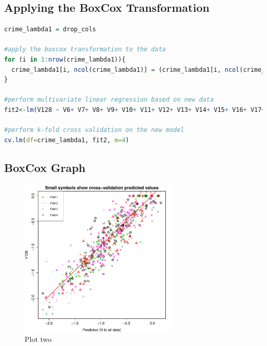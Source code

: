 \documentclass{article}
\begin{document}
\subsection{Applying the BoxCox Transformation}
\begin{lstlisting}[language=r]
crime_lambda1 = drop_cols

#apply the boxcox transformation to the data
for (i in 1:nrow(crime_lambda1)){
  crime_lambda1[i, ncol(crime_lambda1)] = (crime_lambda1[i, ncol(crime_lambda1)]^0.3-1)/0.3
}

#perform multivariate linear regression based on new data
fit2<-lm(V128 ~ V6+ V7+ V8+ V9+ V10+ V11+ V12+ V13+ V14+ V15+ V16+ V17+ V18+ V19+ V20+ V21+ V22+ V23+ V24+ V25+ V26+ V27+ V28+ V29+ V30+ V32+ V33+ V34+ V35+ V36+ V37+ V38+ V39+ V40+ V41+ V42+ V43+ V44+ V45+ V46+ V47+ V48+ V49+ V50+ V51+ V52+ V53+ V54+ V55+ V56+ V57+ V58+ V59+ V60+ V61+ V62+ V63+ V64+ V65+ V66+ V67+ V68+ V69+ V70+ V71+ V72+ V73+ V74+ V75+ V76+ V77+ V78+ V79+ V80+ V81+ V82+ V83+ V84+ V85+ V86+ V87+ V88+ V89+ V90+ V91+ V92+ V93+ V94+ V95+ V96+ V97+ V98+ V99+ V100+ V101+ V119+ V120+ V121+ V126, data=crime_lambda1)

#perform k-fold cross validation on the new model
cv.lm(df=crime_lambda1, fit2, m=4)
\end{lstlisting}

\subsection{BoxCox Graph}
\begin{figure}[H]
\centering
\includegraphics[width=3.0in]{part1b.pdf}
\caption{Plot two}\label{fig_container} 
\end{figure}
\end{document}
